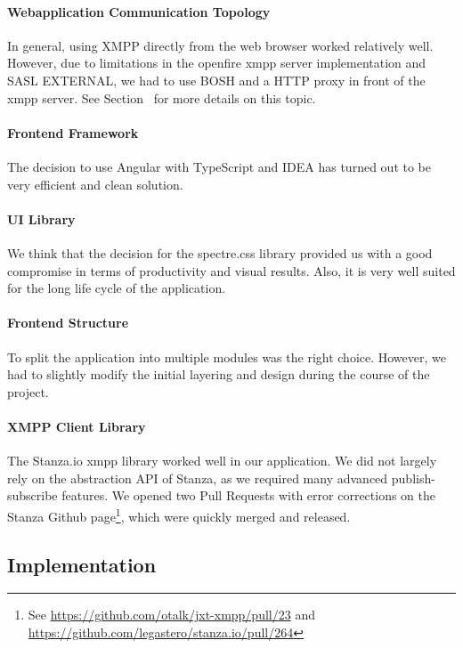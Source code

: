 \paragraph{Webapplication Communication Topology}
In general, using XMPP directly from the web browser worked relatively well.
However, due to limitations in the openfire \gls{xmpp} server implementation and SASL EXTERNAL, we had to use BOSH and a HTTP proxy in front of the \gls{xmpp} server. See Section~ for more details on this topic.

\paragraph{Frontend Framework}
The decision to use Angular with TypeScript and IDEA has turned out to be very efficient and clean solution.

\paragraph{UI Library}
We think that the decision for the spectre.css library provided us with a good compromise in terms of productivity and visual results. Also, it is very well suited for the long life cycle of the application.

\paragraph{Frontend Structure}
To split the application into multiple modules was the right choice.
However, we had to slightly modify the initial layering and design during the course of the project.

\paragraph{XMPP Client Library}
The Stanza.io \gls{xmpp} library worked well in our application.
We did not largely rely on the abstraction API of Stanza, as we required many advanced \gls{publish-subscribe} features.
We opened two Pull Requests with error corrections on the Stanza Github page\footnote{See \url{https://github.com/otalk/jxt-xmpp/pull/23} and \url{https://github.com/legastero/stanza.io/pull/264}},
which were quickly merged and released.

\subsection{Implementation}


